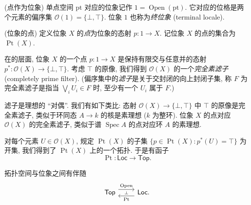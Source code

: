 
\begin{example}
	{(点作为位象)}
	单点空间 $\text{pt}$ 对应的位象记作 $1 = \operatorname{Open}(\text{pt})$.
	它对应的位格是两个元素的偏序集 $\mathcal O(1) = \{\bot,\top\}$.
	位象 $1$ 也称为\emph{终位象} (terminal locale).
\end{example}


\begin{definition}
	[label={points-of-locale}]
	{(位象的点)}
	定义位象 $X$ 的\emph{点}为位象的态射 $p\colon 1 \to X$.
	记位象 $X$ 的点的集合为 $\operatorname{Pt}(X)$.
\end{definition}

在\fm{}的层面, 位象 $X$ 的一个点 $p\colon 1 \to X$ 是保持有限交与任意并的态射 $p^*\colon \mathcal O(X) \to \{\bot,\top\}$.
考虑 $\top$ 的原像, 我们得到 $\mathcal O(X)$ 的一个\emph{完全素滤子} (completely prime filter). (偏序集中的\emph{滤子}是关于交封闭的向上封闭子集, 称 $F$ 为完全素滤子是指当 $\bigvee_i U_i \in F$ 时, 至少有一个 $U_i$ 属于 $F$.)

\begin{remark}
	{}
	滤子是理想的 ``对偶''. 我们有如下类比: 态射 $\mathcal O(X)\to \{\bot,\top\}$ 中 $\top$ 的原像是完全素滤子, 类似于环同态 $A\to k$ 的核是素理想 ($k$ 为整环). 位象 $X$ 的点对应 $\mathcal O(X)$ 的完全素滤子, 类似于谱 $\operatorname{Spec}A$ 的点对应环 $A$ 的素理想.
\end{remark}

对每个元素 $U\in\mathcal O(X)$, 规定 $\operatorname{Pt}(X)$ 的子集
$\{p \in \operatorname{Pt}(X) \colon p^*(U) = \top\}$ 为开集,
我们得到了 $\operatorname{Pt}(X)$ 上的一个拓扑. 于是有函子
$$\operatorname{Pt} \colon \mathsf {Loc} \to \mathsf {Top}.$$

\begin{prop}
	[label={top-loc-adjunction}]
	{}
	拓扑空间与位象之间有伴随
	\[\begin{tikzcd}[ampersand replacement=\&]
		{\mathsf {Top}} \& {\mathsf {Loc}.}
		\arrow[""{name=0, anchor=center, inner sep=0}, "{\operatorname{Open}}", shift left=2, from=1-1, to=1-2]
		\arrow[""{name=1, anchor=center, inner sep=0}, "{\operatorname{Pt}}", shift left=2, from=1-2, to=1-1]
		\arrow["\dashv"{anchor=center, rotate=-90}, draw=none, from=0, to=1]
	\end{tikzcd}\]
\end{prop}

